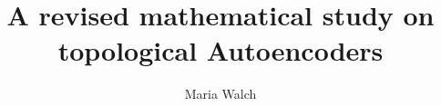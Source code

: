 \documentclass[]{article}
\title{A revised mathematical study on topological Autoencoders}
\author{Maria Walch}
\begin{document}
\maketitle

\begin{abstract}

\end{abstract}

\section{}
\end{document}

